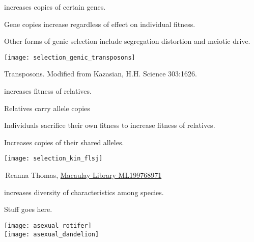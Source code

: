 \documentclass[t]{beamer}
\begin{document}
\begin{frame}[t,plain]{ increases copies of certain genes.}

\begin{multicols}{2}
\hangpara Gene copies increase regardless of effect on individual fitness.

\hangpara Other forms of genic selection include segregation distortion and meiotic drive.

\columnbreak

\texttt{[image: selection\_genic\_transposons]}

\end{multicols}

\vfilll

\tiny \hfill Transposons. Modified from Kazasian, H.H. Science 303:1626.

\end{frame}


\begin{frame}[t]{ increases fitness of relatives.}

\vspace{-\baselineskip}

\begin{multicols}{2}

\hangpara Relatives carry allele copies 

\hangpara Individuals sacrifice their own fitness to increase fitness of relatives.

\hangpara Increases copies of their shared alleles.

\columnbreak

\texttt{[image: selection\_kin\_flsj]}

\end{multicols}

\vfilll

\tiny \hfill \textcopyright\,Reanna Thomas, \href{https://macaulaylibrary.org/asset/199768971}{Macaulay Library ML199768971}

\end{frame}


\begin{frame}[t]{ increases diversity of characteristics among species.}

\vspace{-\baselineskip}

\begin{multicols}{2}

Stuff goes here.

\columnbreak

\texttt{[image: asexual\_rotifer]}\\
\texttt{[image: asexual\_dandelion]}
\end{multicols}


\end{frame}
\end{document}
